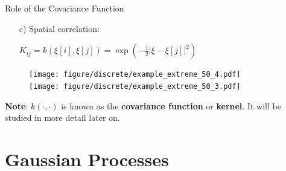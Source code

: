 \begin{vbframe}{Role of the Covariance Function}
\begin{itemize}
  \vspace*{0.2cm}
  \begin{enumerate}
    \item[c)] Spatial correlation: \begin{footnotesize}$K_{ij} = k(\xi[i], \xi[j]) = \exp\left(-\frac{1}{2}\left|\xi - \xi[j]\right|^2\right)$\end{footnotesize}
  \end{enumerate}
  
\begin{figure}
  \texttt{[image: figure/discrete/example\_extreme\_50\_4.pdf]} ~~  \texttt{[image: figure/discrete/example\_extreme\_50\_3.pdf]}
\end{figure}

\end{itemize}

\begin{footnotesize}
\textbf{Note}: $k(\cdot,\cdot)$ is known as the \textbf{covariance function} or \textbf{kernel}. It will be studied in more detail later on.
\end{footnotesize}

\end{vbframe}











\section{Gaussian Processes}

